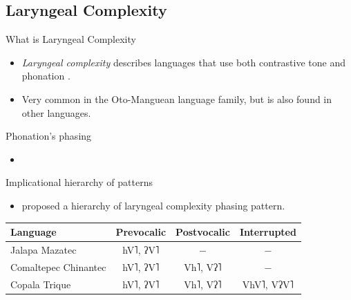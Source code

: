 \documentclass[professionalfont]{beamer}
\providecommand{\lsptoprule}{\midrule\toprule}
\providecommand{\lspbottomrule}{\bottomrule\midrule}
\begin{document}
\subsection{Laryngeal Complexity}

\begin{frame}{What is Laryngeal Complexity}
  \begin{itemize}
    \item \textit{Laryngeal complexity} describes languages that use both contrastive tone and phonation \citep{silvermanLaryngealComplexityOtomanguean1997,silvermanPhasingRecoverability1997}.
    \item Very common in the Oto-Manguean language family, but is also found in other languages.
  \end{itemize}
\end{frame}

\begin{frame}{Phonation's phasing}
  \begin{itemize}
    \item 
  \end{itemize}
\end{frame}

\begin{frame}{Implicational hierarchy of patterns}
  \begin{itemize}
    \item \citet{silvermanLaryngealComplexityOtomanguean1997} proposed a hierarchy of laryngeal complexity phasing pattern.
  \end{itemize}
  \begin{table}[h!]
    \begin{tabular}{lccc}
        \lsptoprule
        \textbf{Language} & \textbf{Prevocalic} & \textbf{Postvocalic} & \textbf{Interrupted} \\
        \hline 
        Jalapa Mazatec & hV˥, ʔV˥ & $-$ & $-$ \\
        Comaltepec Chinantec & hV˥, ʔV˥ & Vh˥, Vʔ˥ & $-$ \\
        Copala Trique & hV˥, ʔV˥ & Vh˥, Vʔ˥ & VhV˥, VʔV˥ \\
        \lspbottomrule
    \end{tabular}
\end{table}
\end{frame}
\end{document}
